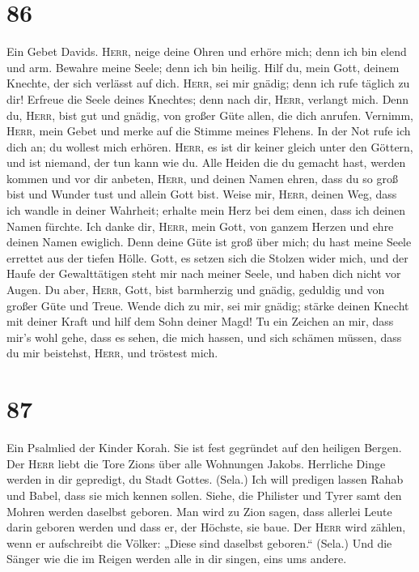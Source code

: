 \hypertarget{section-85}{%
\section{86}\label{section-85}}

 Ein Gebet Davids. \textsc{Herr}, neige deine Ohren und
erhöre mich; denn ich bin elend und arm.  Bewahre meine
Seele; denn ich bin heilig. Hilf du, mein Gott, deinem Knechte, der sich
verlässt auf dich.  \textsc{Herr}, sei mir gnädig; denn
ich rufe täglich zu dir!  Erfreue die Seele deines
Knechtes; denn nach dir, \textsc{Herr}, verlangt mich. 
Denn du, \textsc{Herr}, bist gut und gnädig, von großer Güte allen, die
dich anrufen.  Vernimm, \textsc{Herr}, mein Gebet und
merke auf die Stimme meines Flehens.  In der Not rufe ich
dich an; du wollest mich erhören.  \textsc{Herr}, es ist
dir keiner gleich unter den Göttern, und ist niemand, der tun kann wie
du.  Alle Heiden die du gemacht hast, werden kommen und
vor dir anbeten, \textsc{Herr}, und deinen Namen ehren, 
dass du so groß bist und Wunder tust und allein Gott bist.
 Weise mir, \textsc{Herr}, deinen Weg, dass ich wandle in
deiner Wahrheit; erhalte mein Herz bei dem einen, dass ich deinen Namen
fürchte.  Ich danke dir, \textsc{Herr}, mein Gott, von
ganzem Herzen und ehre deinen Namen ewiglich.  Denn deine
Güte ist groß über mich; du hast meine Seele errettet aus der tiefen
Hölle.  Gott, es setzen sich die Stolzen wider mich, und
der Haufe der Gewalttätigen steht mir nach meiner Seele, und haben dich
nicht vor Augen.  Du aber, \textsc{Herr}, Gott, bist
barmherzig und gnädig, geduldig und von großer Güte und Treue.
 Wende dich zu mir, sei mir gnädig; stärke deinen Knecht
mit deiner Kraft und hilf dem Sohn deiner Magd!  Tu ein
Zeichen an mir, dass mir's wohl gehe, dass es sehen, die mich hassen,
und sich schämen müssen, dass du mir beistehst, \textsc{Herr}, und
tröstest mich.

\hypertarget{section-86}{%
\section{87}\label{section-86}}

 Ein Psalmlied der Kinder Korah. Sie ist fest gegründet
auf den heiligen Bergen.  Der \textsc{Herr} liebt die Tore
Zions über alle Wohnungen Jakobs.  Herrliche Dinge werden
in dir gepredigt, du Stadt Gottes. (Sela.)  Ich will
predigen lassen Rahab und Babel, dass sie mich kennen sollen. Siehe, die
Philister und Tyrer samt den Mohren werden daselbst geboren.
 Man wird zu Zion sagen, dass allerlei Leute darin geboren
werden und dass er, der Höchste, sie baue.  Der
\textsc{Herr} wird zählen, wenn er aufschreibt die Völker: „Diese sind
daselbst geboren.`` (Sela.)  Und die Sänger wie die im
Reigen werden alle in dir singen, eins ums andere.

